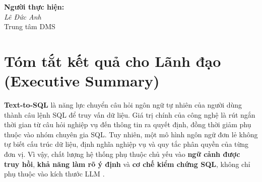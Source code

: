 \documentclass[12pt,a4paper]{article}
\begin{document}
\begin{titlepage}
\vspace{0.18cm}

\begin{center}
\setlength{\fboxsep}{0pt}
\end{center}

\vfill

\begin{flushright}\small
\textbf{Người thực hiện:}\\
\textit{Lê Đức Anh}\\
Trung tâm DMS
\end{flushright}

\end{titlepage}

\setcounter{page}{1}
\setcounter{tocdepth}{1}
\tableofcontents
\clearpage

\section{Tóm tắt kết quả cho Lãnh đạo (Executive Summary)}

\textbf{Text-to-SQL} là năng lực chuyển câu hỏi ngôn ngữ tự nhiên của người
dùng thành câu lệnh SQL để truy vấn dữ liệu. Giá trị chính của công nghệ là
rút ngắn thời gian từ câu hỏi nghiệp vụ đến thông tin ra quyết định, đồng
thời giảm phụ thuộc vào nhóm chuyên gia SQL. Tuy nhiên, một mô hình ngôn ngữ
đơn lẻ không tự biết cấu trúc dữ liệu, định nghĩa nghiệp vụ và quy tắc phân
quyền của từng đơn vị. Vì vậy, chất lượng hệ thống phụ thuộc chủ yếu vào
\textbf{ngữ cảnh được truy hồi}, \textbf{khả năng làm rõ ý định} và
\textbf{cơ chế kiểm chứng SQL}, không chỉ phụ thuộc vào kích thước LLM
\cite{google2025,vannapaper2023}.
\end{document}
